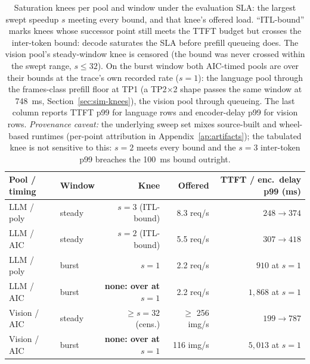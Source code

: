 \begin{table}[htbp]
\centering
\caption{Saturation knees per pool and window under the evaluation SLA:
the largest swept speedup $s$ meeting every bound, and that knee's offered
load. ``ITL-bound'' marks knees whose successor point still meets the TTFT
budget but crosses the inter-token bound: decode saturates the SLA
before prefill queueing does. The vision pool's steady-window knee is
censored (the bound was never crossed within the swept range, $s \leq 32$).
On the burst window both AIC-timed pools are over their bounds at the
trace's own recorded rate ($s{=}1$): the language pool through the
frames-class prefill floor at TP1 (a TP2$\times$2 shape passes the same
window at \SI{748}{\milli\second}, Section~\ref{sec:sim-knees}), the
vision pool through queueing. The last column reports TTFT p99 for
language rows and encoder-delay p99 for vision rows. \emph{Provenance
caveat:} the underlying sweep set mixes source-built and wheel-based
runtimes (per-point attribution in Appendix~\ref{ap:artifacts}); the
tabulated knee is not sensitive to this: $s{=}2$ meets every bound and the
$s{=}3$ inter-token p99 breaches the \SI{100}{\milli\second} bound
outright.}
\label{tab:sim-knees}
\footnotesize
\setlength{\tabcolsep}{3pt}
\begin{tabular}{llrrr}
\toprule
Pool / timing & Window & Knee & Offered & TTFT / enc.\ delay p99 (ms) \\
\midrule
LLM / poly & steady & $s{=}3$ (ITL-bound) & 8.3 req/s & $248 \to 374$ \\
LLM / AIC  & steady & $s{=}2$ (ITL-bound) & 5.5 req/s & $307 \to 418$ \\
LLM / poly & burst & $s{=}1$ & 2.2 req/s & $910$ at $s{=}1$ \\
LLM / AIC  & burst & \textbf{none: over at $s{=}1$} & 2.2 req/s & $1{,}868$ at $s{=}1$ \\
Vision / AIC & steady & $\geq s{=}32$ (cens.) & $\geq$ 256 img/s & $199 \to 787$ \\
Vision / AIC & burst & \textbf{none: over at $s{=}1$} & 116 img/s & $5{,}013$ at $s{=}1$ \\
\bottomrule
\end{tabular}
\end{table}

